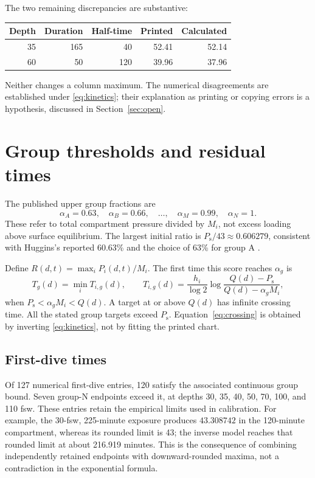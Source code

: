 \documentclass[11pt,letterpaper]{article}
\newcommand{\Ps}{P_{\mathrm{s}}}
\begin{document}
The two remaining discrepancies are substantive:
\begin{center}
\begin{tabular}{@{}rrrrr@{}}\toprule
Depth&Duration&Half-time&Printed&Calculated\\\midrule
35&165&40&52.41&52.14\\
60&50&120&39.96&37.96\\\bottomrule
\end{tabular}
\end{center}
Neither changes a column maximum. The numerical disagreements are established under \eqref{eq:kinetics}; their explanation as printing or copying errors is a hypothesis, discussed in Section~\ref{sec:open}.

\section{Group thresholds and residual times}
The published upper group fractions are
\[
\alpha_A=0.63,\quad\alpha_B=0.66,\quad\ldots,\quad
\alpha_M=0.99,\quad\alpha_N=1.
\]
These refer to total compartment pressure divided by $M_i$, not excess loading above surface equilibrium. The largest initial ratio is $\Ps/43\approx0.606279$, consistent with Huggins's reported 60.63\% and the choice of 63\% for group A \cite[p.~5]{Huggins1981}.

Define $R(d,t)=\max_i P_i(d,t)/M_i$. The first time this score reaches $\alpha_g$ is
\begin{equation}
T_g(d)=\min_i T_{i,g}(d),\qquad
T_{i,g}(d)=\frac{h_i}{\log2}
\log\frac{Q(d)-\Ps}{Q(d)-\alpha_gM_i},
\label{eq:crossing}
\end{equation}
when $\Ps<\alpha_gM_i<Q(d)$. A target at or above $Q(d)$ has infinite crossing time. All the stated group targets exceed $\Ps$. Equation~\eqref{eq:crossing} is obtained by inverting \eqref{eq:kinetics}, not by fitting the printed chart.

\subsection{First-dive times}
Of 127 numerical first-dive entries, 120 satisfy the associated continuous group bound. Seven group-N endpoints exceed it, at depths 30, 35, 40, 50, 70, 100, and 110 fsw. These entries retain the empirical limits used in calibration. For example, the 30-fsw, 225-minute exposure produces $43.308742$ in the 120-minute compartment, whereas its rounded limit is 43; the inverse model reaches that rounded limit at about 216.919 minutes. This is the consequence of combining independently retained endpoints with downward-rounded maxima, not a contradiction in the exponential formula.
\end{document}
